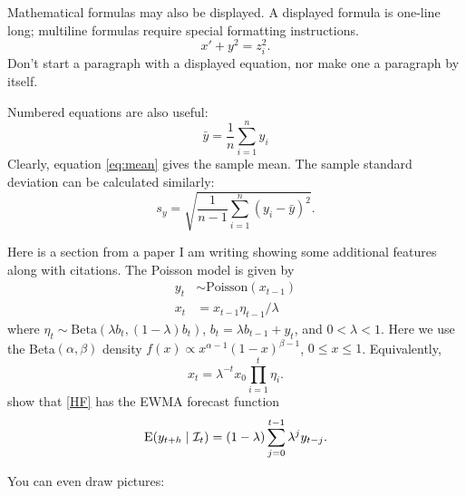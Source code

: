 \documentclass[a4paper,11pt]{article}
\newcommand{\info}{{\cal I}}
\newcommand{\E}{\text{E}}
\begin{document}
Mathematical formulas may also be displayed.  A displayed formula
is one-line long; multiline formulas require special formatting
instructions.
\[
  x' + y^{2} = z_{i}^{2}.
\]
Don't start a paragraph with a displayed equation, nor make one a
paragraph by itself.

Numbered equations are also useful:
\begin{equation}\label{eq:mean} 
         \bar{y} = \frac{1}{n} \sum_{i=1}^{n} y_i
\end{equation}
Clearly, equation \eqref{eq:mean} gives the sample mean.  The
sample standard deviation can be calculated similarly:
\begin{equation}
        s_y = \sqrt{ \frac{1}{n-1} \sum_{i=1}^n (y_i-\bar{y})^2 }.
\end{equation}

Here is a section from a paper I am writing showing some additional features along with citations. The Poisson model \citep{SM86} is given by
\begin{subequations}\label{HF}
\begin{align}
y_t   &\sim \text{Poisson}(x_{t-1}) \label{HF.1} \\
x_t &= x_{t-1} \eta_{t-1}/\lambda  \label{HF.2}
\end{align}
\end{subequations}
where $\eta_t \sim \text{Beta}(\lambda b_t,(1-\lambda) b_t)$, $b_t=\lambda b_{t-1}+y_t $, and $0<\lambda<1$.  Here we use the Beta$(\alpha,\beta)$ density $f(x) \propto x^{\alpha-1}(1-x)^{\beta-1}$, $0\le x\le1$. Equivalently,
\begin{equation}\label{prodeta}
x_t = \lambda^{-t}x_0\prod_{i=1}^t\eta_i.
\end{equation}
\citet{HF89} show that \eqref{HF} has the EWMA forecast function
\[
  \E(y_{t+h}\mid \info_t) = (1-\lambda)\sum_{j=0}^{t-1} \lambda^j y_{t-j}.
\]


You can even draw pictures:
\begin{center}
\end{center}



\end{document}
